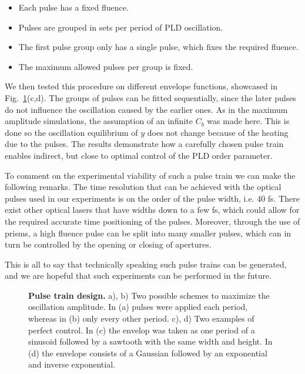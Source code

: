 \begin{itemize}
	\item Each pulse has a fixed fluence.
	\item Pulses are grouped in sets per period of PLD oscillation.
	\item The first pulse group only has a single pulse, which fixes the required fluence.
	\item The maximum allowed pulses per group is fixed.
\end{itemize}
We then tested this procedure on different envelope functions, showcased in Fig.~\ref{fig:Cr_control}(c,d).
The groups of pulses can be fitted sequentially, since the later pulses do not influence the oscillation caused by the earlier ones.
As in the maximum amplitude simulations, the assumption of an infinite $C_b$ was made here.
This is done so the oscillation equilibrium of $y$ does not change because of the heating due to the pulses.
The results demonstrate how a carefully chosen pulse train enables indirect, but close to optimal control of the PLD order parameter.

To comment on the experimental viability of such a pulse train we can make the following remarks.
The time resolution that can be achieved with the optical pulses used in our experiments is on the order of the pulse width, i.e. 40 fs. There exist other optical lasers that have widths down to a few fs, which could allow for the required accurate time positioning of the pulses.
Moreover, through the use of prisms, a high fluence pulse can be split into many smaller pulses, which can in turn be controlled by the opening or closing of apertures.

This is all to say that technically speaking such pulse trains can be generated, and we are hopeful that such experiments can be performed in the future.
\begin{figure}
	\caption{\label{fig:Cr_control} {\bf Pulse train design.} a), b) Two possible schemes to maximize the oscillation amplitude. In (a) pulses were applied each period, whereas in (b) only every other period. c), d) Two examples of perfect control. In (c) the envelop was taken as one period of a sinusoid followed by a sawtooth with the same width and height. In (d) the envelope consists of a Gaussian followed by an exponential and inverse exponential.}
\end{figure}

